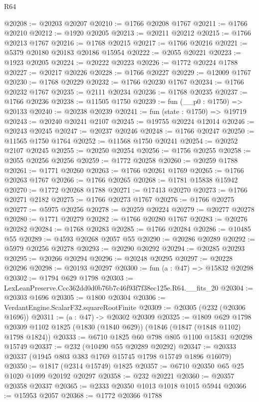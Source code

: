 \begin{lexlean}{R64}
\begin{coremodule}
@20208 := @20203 @20207
@20210 := @1766 @20208 @1767
@20211 := @1766 @20210
@20212 := @1920 @20205
@20213 := @20211 @20212
@20215 := @1766 @20213 @1767
@20216 := @1768 @20215
@20217 := @1766 @20216
@20221 := @5379 @20180 @20183 @20186 @15954
@20222 := @2055 @20221
@20223 := @1923 @20205
@20224 := @20222 @20223
@20226 := @1772 @20224 @1788
@20227 := @20217 @20226
@20228 := @1766 @20227
@20229 := @12009 @1767
@20230 := @1768 @20229
@20232 := @1766 @20230 @1767
@20234 := @1766 @20232 @1767
@20235 := @2111 @20234
@20236 := @1768 @20235
@20237 := @1766 @20236
@20238 := @11505 @1750
@20239 := fun (__p0 : @1750) => @20133
@20240 := @20238 @20239
@20241 := fun (state : @1750) => @19719
@20243 := @20240 @20241 @2107
@20245 := @19755 @20224 @12014
@20246 := @20243 @20245
@20247 := @20237 @20246
@20248 := @1766 @20247
@20250 := @11565 @1750 @1764
@20252 := @11568 @1750 @20241
@20254 := @20252 @2107 @20245
@20255 := @20250 @20254
@20256 := @1756 @20255
@20258 := @2055 @20256 @20256
@20259 := @1772 @20258
@20260 := @20259 @1788
@20261 := @1771 @20260
@20263 := @1766 @20261 @1769
@20265 := @1766 @20263 @1767
@20266 := @1766 @20265
@20268 := @1781 @15838 @15942
@20270 := @1772 @20268 @1788
@20271 := @17413 @20270
@20273 := @1766 @20271 @2182
@20275 := @1766 @20273 @1767
@20276 := @1766 @20275
@20277 := @5975 @20256
@20278 := @20259 @20224
@20279 := @20277 @20278
@20280 := @1771 @20279
@20282 := @1766 @20280 @1767
@20283 := @20276 @20282
@20284 := @1768 @20283
@20285 := @1766 @20284
@20286 := @10485 @55
@20289 := @4593 @20268 @2057 @55
@20290 := @20286 @20289
@20292 := @5979 @20256 @20278
@20293 := @20290 @20292
@20294 := @20285 @20293
@20295 := @20266 @20294
@20296 := @20248 @20295
@20297 := @20228 @20296
@20298 := @20193 @20297
@20300 := fun (a : @47) => @15832 @20298
@20302 := @1794 @629 @1798
@20303 := LexLeanPreserve.Ccc362dd0d0b76b7c46f93f7f38ec125e.R64.__fits_20
@20304 := @20303 @1696
@20305 := @1800 @20304
@20306 := VerdantEngine.ScalarF32.squareRootFinite
@20309 := @20305 (@232 (@20306 @1696))
@20311 := (a : @47) -> @20302 @20309
@20325 := @1809
    @629
    @1798
    @20309
    @1102
    @1825
    (@1830 (@1840 @629))
    (@1846 (@1847 (@1848 @1102) @1798 @1824))
@20333 := @6710 @1825 @60 @798 @805 @1100 @15831 @20298 @15749
@20337 := @232 (@10490 @55 @20289 @20292)
@20347 := @20333 @20337 (@1945 @803 @383 @1769 @15745 @1798 @15749 @1896 @16079)
@20350 := @1817 (@2314 @15749) @1825
@20357 := @6710 @20350 @65 @25 @1020 @1099 @20192 @20297
@20358 := @232 @20221
@20360 := @20357 @20358 @20337
@20365 := @2333 @20350 @1013 @1018 @1015 @5944
@20366 := @15953 @2057
@20368 := @1772 @20366 @1788

\end{coremodule}
\end{lexlean}
